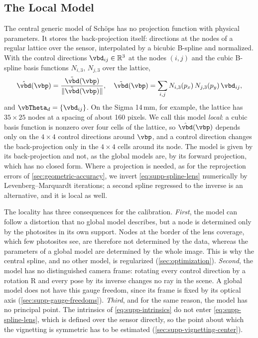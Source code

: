 \subsection{The Local Model}
\label{sec:supp-local-model}
The central generic model of Schöps \etal \cite{10000params} has no
projection function with physical parameters. It stores the
back-projection itself: directions at the nodes of a regular lattice
over the sensor, interpolated by a bicubic B-spline
\cite{piegl1997nurbs} and normalized. With the control directions
$\vbd_{ij}\in\mathbb{R}^3$ at the nodes $(i,j)$ and the cubic
B-spline basis functions $N_{i,3}$, $N_{j,3}$ over the lattice,
\begin{equation}
\label{eq:supp-spline-lens}
    \hat{\vbd}(\vbp) = \frac{\tilde{\vbd}(\vbp)}{\lVert\tilde{\vbd}(\vbp)\rVert},
    \quad
    \tilde{\vbd}(\vbp) = \sum_{i,j}N_{i,3}(p_x)\,N_{j,3}(p_y)\,\vbd_{ij},
\end{equation}
and $\vbTheta_d=\{\vbd_{ij}\}$. On the Sigma 14\,mm, for example, the
lattice has $35\times25$ nodes at a spacing of about 160 pixels. We
call this model \emph{local}: a cubic basis function is nonzero over
four cells of the lattice, so $\hat{\vbd}(\vbp)$ depends only on the
$4\times4$ control directions around $\vbp$, and a control direction
changes the back-projection only in the $4\times4$ cells around its
node. The model is given by its back-projection and not, as the
global models are, by its forward projection, which has no closed
form. Where a projection is needed, as for the reprojection errors of
\cref{sec:geometric-accuracy}, we invert
\cref{eq:supp-spline-lens} numerically by Levenberg--Marquardt
iterations; a second spline regressed to the inverse is an
alternative, and it is local as well.

The locality has three consequences for the calibration.
\emph{First}, the model can follow a distortion that no global model
describes, but a node is determined only by the photosites in its
own support. Nodes at the border of the lens coverage, which few
photosites see, are therefore not determined by the data, whereas
the parameters of a global model are determined by the whole image.
This is why the central spline, and no other model, is regularized
(\cref{sec:optimization}). \emph{Second}, the model has no
distinguished camera frame: rotating every control direction by a
rotation $\mathrm{R}$ and every pose by its inverse changes no ray
in the scene. A global model does not have this gauge freedom, since
its frame is fixed by its optical axis
(\cref{sec:supp-gauge-freedoms}). \emph{Third}, and for the same
reason, the model has no principal point. The intrinsics of
\cref{eq:supp-intrinsics} do not enter \cref{eq:supp-spline-lens},
which is defined over the sensor directly, so the point about which
the vignetting is symmetric has to be estimated
(\cref{sec:supp-vignetting-center}).


